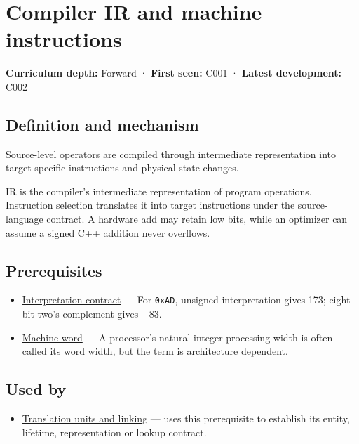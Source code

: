 \hypertarget{appendix-942ad41afb30}{}
\section{Compiler IR and machine instructions}\label{appendix-942ad41afb30-compiler-ir-and-machine-instructions}

\textbf{Curriculum depth:} Forward · \textbf{First seen:} C001 · \textbf{Latest development:} C002

\subsection{Definition and mechanism}\label{appendix-942ad41afb30-definition-and-mechanism}

Source-level operators are compiled through intermediate representation into target-specific instructions and physical state changes.

IR is the compiler's intermediate representation of program operations. Instruction selection translates it into target instructions under the source-language contract. A hardware add may retain low bits, while an optimizer can assume a signed C++ addition never overflows.

\subsection{Prerequisites}\label{appendix-942ad41afb30-prerequisites}

\begin{itemize}
\tightlist
\item
  \hyperref[appendix-f414bd4ed05c]{Interpretation contract} --- For \texttt{0xAD}, unsigned interpretation gives 173; eight-bit two's complement gives −83.
\item
  \hyperref[appendix-d67a19507dc5]{Machine word} --- A processor's natural integer processing width is often called its word width, but the term is architecture dependent.
\end{itemize}

\subsection{Used by}\label{appendix-942ad41afb30-used-by}

\begin{itemize}
\tightlist
\item
  \hyperref[appendix-806686359e1b]{Translation units and linking} --- uses this prerequisite to establish its entity, lifetime, representation or lookup contract.
\end{itemize}

